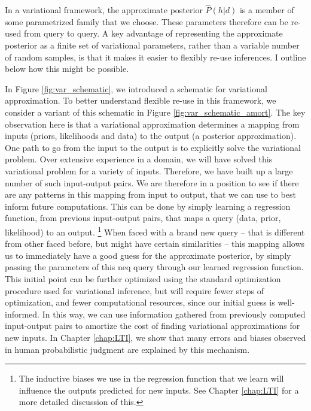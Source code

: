 In a variational framework, the approximate posterior $\hat{P}(h | d)$ is a member of some parametrized family that we choose. These parameters therefore can be re-used from query to query. A key advantage of representing the approximate posterior as a finite set of variational parameters, rather than a variable number of random samples, is that it makes it easier to flexibly re-use inferences. I outline below how this might be possible.

In Figure \ref{fig:var_schematic}, we introduced a schematic for variational approximation. To better understand flexible re-use in this framework, we consider a variant of this schematic in Figure \ref{fig:var_schematic_amort}. The key observation here is that a variational approximation determines a mapping from inputs (priors, likelihoods and data) to the output (a posterior approximation). One path to go from the input to the output is to explicitly solve the variational problem. Over extensive experience in a domain, we will have solved this variational problem for a variety of inputs. Therefore, we have built up a large number of such input-output pairs. We are therefore in a position to see if there are any patterns in this mapping from input to output, that we can use to best inform future computations. This can be done by simply learning a regression function, from previous input-output pairs, that maps a query (data, prior, likelihood) to an output. \footnote{The inductive biases we use in the regression function that we learn will influence the outputs predicted for new inputs. See Chapter \ref{chap:LTI} for a more detailed discussion of this.} When faced with a brand new query -- that is different from other faced before, but might have certain similarities -- this mapping allows us to immediately have a good guess for the approximate posterior, by simply passing the parameters of this neq query through our learned regression function. This initial point can be further optimized using the standard optimization procedure used for variational inference, but will require fewer steps of optimization, and fewer computational resources, since our initial guess is well-informed. In this way, we can use information gathered from previously computed input-output pairs to amortize the cost of finding variational approximations for new inputs. In Chapter \ref{chap:LTI}, we show that many errors and biases observed in human probabilistic judgment are explained by this mechanism.

